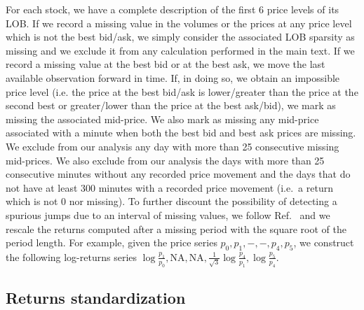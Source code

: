 \documentclass[amsmath,amssymb,aps,pre,floatfix,twocolumn,superscriptaddress]{revtex4}
\begin{document}
For each stock, we have a complete description of the first 6 price levels of its LOB. If we record a missing value in the volumes or the prices at any price level which is not the best bid/ask, we simply consider the associated LOB sparsity as missing and we exclude it from any calculation performed in the main text. If we record a missing value at the best bid or at the best ask, we move the last available observation forward in time. If, in doing so, we obtain an impossible price level (i.e. the price at the best bid/ask is lower/greater than the price at the second best or greater/lower than the price at the best ask/bid), we mark as missing the associated mid-price. We also mark as missing any mid-price associated with a minute when both the best bid and best ask prices are missing. We exclude from our analysis any day with more than 25 consecutive missing mid-prices. We also exclude from our analysis the days with more than 25 consecutive minutes without any recorded price movement and the days that do not have at least 300 minutes with a recorded price movement (i.e.~a return which is not 0 nor missing). To further discount the possibility of detecting a spurious jumps due to an interval of missing values, we follow Ref.~\cite{cojump_news}  and we rescale the returns computed after a missing period with the square root of the period length. For example, given the price series $p_0, p_1, -, -, p_4, p_5$, we construct the following log-returns series $\log \frac{p_1}{p_0}, \text{NA}, \text{NA},\frac{1}{\sqrt{3}} \log \frac{p_4}{p_1},\log \frac{p_5}{p_4}$.    

\subsection{Returns standardization}
\end{document}
